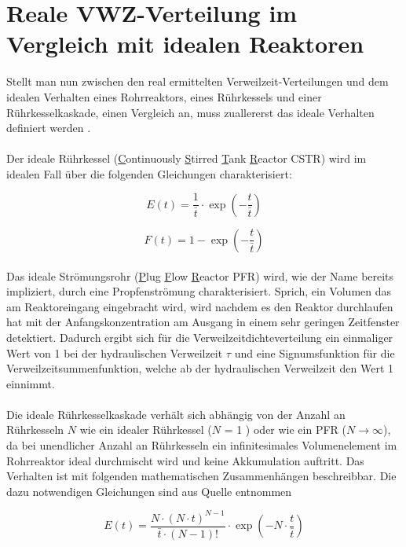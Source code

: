 \documentclass[12pt,liststotoc]{report}
\begin{document}
\section{Reale VWZ-Verteilung im Vergleich mit idealen Reaktoren}

Stellt man nun zwischen den real ermittelten Verweilzeit-Verteilungen und dem idealen Verhalten eines Rohrreaktors, eines Rührkessels und einer Rührkesselkaskade, einen Vergleich an, muss zuallererst das ideale Verhalten definiert werden \cite{Skript_CVT_MCI}.  
\\
\\
Der ideale Rührkessel (\underline{C}ontinuously \underline{S}tirred \underline{T}ank \underline{R}eactor CSTR) wird im idealen Fall über die folgenden Gleichungen charakterisiert:

\begin{equation}
E(t) = \frac{1}{\bar{t}} \cdot \exp\left(-\frac{t}{\bar{t}}\right)
\end{equation}

\begin{equation}
F(t) = 1 - \exp\left(-\frac{t}{\bar{t}}\right)
\end{equation}
\noindent
\\
Das ideale Strömungsrohr (\underline{P}lug \underline{F}low \underline{R}eactor PFR) wird, wie der Name bereits impliziert, durch eine Propfenströmung charakterisiert. Sprich, ein Volumen das am Reaktoreingang eingebracht wird, wird nachdem es den Reaktor durchlaufen hat mit der Anfangskonzentration am Ausgang in einem sehr geringen Zeitfenster detektiert. Dadurch ergibt sich für die Verweilzeitdichteverteilung ein einmaliger Wert von 1 bei der hydraulischen Verweilzeit $\tau$ und eine Signumsfunktion für die Verweilzeitsummenfunktion, welche ab der hydraulischen Verweilzeit den Wert 1 einnimmt. 
\\
\\
Die ideale Rührkesselkaskade verhält sich abhängig von der Anzahl an Rührkesseln $N$ wie ein idealer Rührkessel ($N$ = 1 ) oder wie ein PFR ($N \rightarrow \infty$), da bei unendlicher Anzahl an Rührkesseln ein infinitesimales Volumenelement im Rohrreaktor ideal durchmischt wird und keine Akkumulation auftritt. Das Verhalten ist mit folgenden mathematischen Zusammenhängen beschreibbar. Die dazu notwendigen Gleichungen sind aus Quelle \cite{Skript_2018,Chem_Reaktion_2018} entnommen

\begin{equation}
E(t) = \frac{N \cdot (N \cdot t)^{N-1}}{\bar{t} \cdot (N-1)!} \cdot \exp\left(-N \cdot \frac{t}{\bar{t}}\right)
\end{equation}
\end{document}
